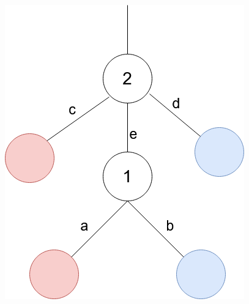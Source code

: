 \documentclass[a4paper]{article}
\begin{document}
\begin{center}
    \includegraphics[scale=0.5]{Ex1.png}
\end{center}
\end{document}
